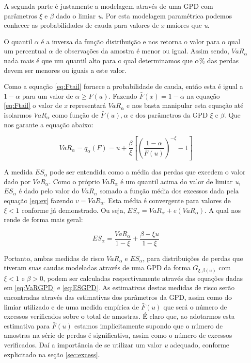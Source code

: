 \documentclass[review]{elsarticle}
\theoremstyle{definition}
\begin{document}
A segunda parte é justamente a modelagem através de uma GPD com parâmetros $\xi \text{ e } \beta$ dado o limiar \emph{u}. Por esta modelagem paramétrica podemos conhecer as probabilidades de cauda para valores de \emph{x} maiores que \emph{u}.

O quantil $\alpha$ é a inversa da função distribuição e nos retorna o valor para o qual um percentual $\alpha$ de observações da amostra é menor ou igual. Assim sendo, $VaR_\alpha$ nada mais é que um quantil alto para o qual determinamos que $\alpha \%$ das perdas devem ser menores ou iguais a este valor.

Como a equação \eqref{eq:Ftail} fornece a probabilidade de cauda, então esta é igual a $1- \alpha$ para um valor de $\alpha  \geq F(u)$. Fazendo $\bar{F}(x)=1-\alpha$ na equação \eqref{eq:Ftail} o valor de \emph{x} representará $VaR_\alpha$ e nos basta manipular esta equação até isolarmos $VaR_\alpha$ como função de $\bar{F}(u), \alpha \text{ e dos parâmetros da GPD } \xi \text{ e } \beta$. Que nos garante a equação abaixo:

\begin{equation}
\label{eq:VaRGPD}
VaR_\alpha = q_\alpha(F) = u+\frac{\beta}{\xi}\left[ \left( \frac{1-\alpha}{\bar{F}(u)}\right)^{-\xi}-1 \right]
\end{equation}

A medida $ES_\alpha$ pode ser entendida como a média das perdas que excedem o valor dado por $VaR_\alpha$. Como o próprio $VaR_\alpha$ é um quantil acima do valor de limiar \emph{u}, $ES_\alpha$ é dado pelo valor do $VaR_\alpha$ somado a função média dos excessos dada pela equação \eqref{eq:ev} fazendo $v = VaR_\alpha$. Esta média é convergente para valores de $\xi < 1$ conforme já demonstrado. Ou seja, $ES_\alpha=VaR_\alpha + e(VaR_\alpha)$. A qual nos rende de forma mais geral:

\begin{equation}
\label{eq:ESGPD}
ES_\alpha = \frac{VaR_\alpha}{1-\xi}+\frac{\beta-\xi u}{1-\xi}
\end{equation}

Portanto, ambas medidas de risco $VaR_\alpha$ e $ES_\alpha$, para distribuições de perdas que tiveram suas caudas modeladas através de uma GPD da forma $G_{\xi, \beta(u)}$ com $\xi <1 \text{ e } \beta > 0$, podem ser calculadas respectivamente através das equações dadas em \eqref{eq:VaRGPD} e \eqref{eq:ESGPD}. As estimativas destas medidas de risco serão encontradas através das estimativas dos parâmetros da GPD, assim como do limiar utilizado e de uma medida empírica de $\bar{F}(u)$ que será o número de excessos verificados sobre o total de amostras. É claro que, ao adotarmos esta estimativa para $\bar{F}(u)$ estamos implicitamente supondo que o número de amostras na série de perdas é significativa, assim como o número de excessos verificados. Daí a importância de se utilizar um valor \emph{u} adequado, conforme explicitado na seção \ref{sec:excess}. 
\end{document}
